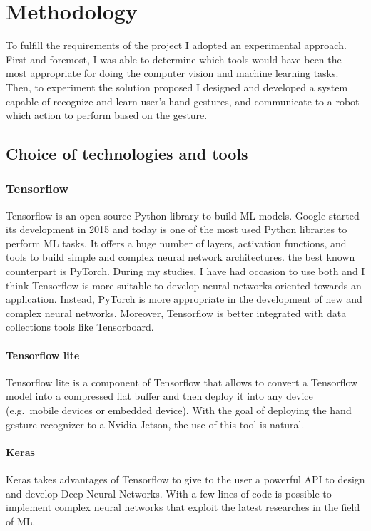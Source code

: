 \documentclass[../thesis.tex]{subfiles}
\begin{document}
\chapter{Methodology}\label{cap:methods}
To fulfill the requirements of the project I adopted an experimental approach. First and foremost, I was able to determine which tools would have been the most appropriate for doing the computer vision and machine learning tasks. Then, to experiment the solution proposed I designed and developed a system capable of recognize and learn user's hand gestures, and communicate to a robot which action to perform based on the gesture.
\section{Choice of technologies and tools}\label{sec:technologies_and_tolls}
\subsection{Tensorflow}
Tensorflow is an open-source Python library to build \acrshort{ML} models. Google started its development in 2015 and today is one of the most used Python libraries to perform \acrshort{ML} tasks. It offers a huge number of layers, activation functions, and tools to build simple and complex neural network architectures. the best known counterpart is PyTorch. During my studies, I have had occasion to use both and I think Tensorflow is more suitable to develop neural networks oriented towards an application. Instead, PyTorch is more appropriate in the development of new and complex neural networks. Moreover, Tensorflow is better integrated with data collections tools like Tensorboard.

\subsubsection{Tensorflow lite}
Tensorflow lite is a component of Tensorflow that allows to convert a Tensorflow model into a compressed flat buffer and then deploy it into any device (e.g.\ mobile devices or embedded device). With the goal of deploying the hand gesture recognizer to a Nvidia Jetson, the use of this tool is natural.

\subsubsection{Keras}
Keras takes advantages of Tensorflow to give to the user a powerful API to design and develop Deep Neural Networks. With a few lines of code is possible to implement complex neural networks that exploit the latest researches in the field of \gls{ML}.
\end{document}
